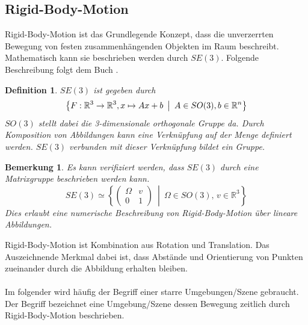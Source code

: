 \documentclass[12pt,DIV=15,BCOR=15mm,twoside,headsepline,abstract=true,listof=totoc,bibliography=totoc]{scrreprt}
\newtheorem{remark}{Bemerkung}[chapter]
\newtheorem{defi}{Definition}
\theoremstyle{remark}    %
\begin{document}
    \subsection{Rigid-Body-Motion}
    Rigid-Body-Motion ist das Grundlegende Konzept, dass die unverzerrten Bewegung von festen zusammenhängenden Objekten im Raum beschreibt. 
    Mathematisch kann sie beschrieben werden durch $SE(3)$. Folgende Beschreibung folgt dem Buch \cite{Murray1994}.
    \begin{defi}
        $SE(3)$ ist gegeben durch 
        \begin{equation}
            \left\{F: \mathbb{R}^3 \to \mathbb{R}^3, x \mapsto Ax + b \hspace{0.5em} \middle| \hspace{0.5em} A \in SO(3), b \in \mathbb{R}^n\right\}
        \end{equation}
        $SO(3)$ stellt dabei die 3-dimensionale orthogonale Gruppe da. 
        Durch Komposition von Abbildungen kann eine Verknüpfung auf der Menge definiert werden. $SE(3)$ verbunden mit dieser Verknüpfung bildet 
        ein Gruppe.
    \end{defi}
    \begin{remark} \label{bem:hom_coords}
    Es kann verifiziert werden, dass $SE(3)$ durch eine Matrixgruppe beschrieben werden kann. \[
        SE(3)  \simeq 
            \left\{
            \begin{pmatrix}
            \Omega & v \\[3pt]
            0 & 1
            \end{pmatrix}
            \ \middle|\ 
            \Omega \in SO(3),\, v \in \mathbb{R}^3
            \right\}
    \]Dies erlaubt eine numerische Beschreibung von Rigid-Body-Motion über lineare Abbildungen.
    \end{remark} \noindent
    Rigid-Body-Motion ist Kombination aus Rotation und Translation. Das Auszeichnende Merkmal dabei ist, dass Abstände und Orientierung von Punkten
    zueinander durch die Abbildung erhalten bleiben.\\\\
    Im folgender wird häufig der Begriff einer starre Umgebungen/Szene gebraucht. Der Begriff bezeichnet eine Umgebung/Szene dessen Bewegung zeitlich 
    durch Rigid-Body-Motion beschrieben.
\end{document}
